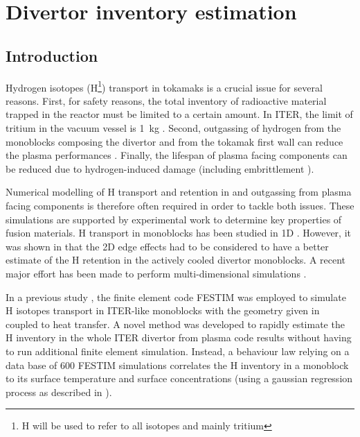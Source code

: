 \chapter{Divertor inventory estimation}
\section{Introduction}
Hydrogen isotopes (H\footnote{H will be used to refer to all isotopes and mainly tritium}) transport in tokamaks is a crucial issue for several reasons.
First, for safety reasons, the total inventory of radioactive material trapped in the reactor must be limited to a certain amount.
In ITER, the limit of tritium in the vacuum vessel is \SI{1}{kg} \cite{temmerman_influence_2018}.
Second, outgassing of hydrogen from the monoblocks composing the divertor and from the tokamak first wall can reduce the plasma performances \cite{grisolia_plasma_1999}.
Finally, the lifespan of plasma facing components can be reduced due to hydrogen-induced damage (including embrittlement \cite{dwivedi_hydrogen_2018}).

Numerical modelling of H transport and retention in and outgassing from plasma facing components \cite{delaporte-mathurin_parametric_2020, delaporte-mathurin_influence_2021, denis_dynamic_2019, dark_influence_2021} is therefore often required in order to tackle both issues. 
These simulations are supported by experimental work to determine key properties of fusion materials.
H transport in monoblocks has been studied in 1D \cite{hodille_estimation_2017}.
However, it was shown in \cite{delaporte-mathurin_finite_2019} that the 2D edge effects had to be considered to have a better estimate of the H retention in the actively cooled divertor monoblocks.
A recent major effort has been made to perform multi-dimensional simulations \cite{delaporte-mathurin_finite_2019, delaporte-mathurin_parametric_2020, delaporte-mathurin_influence_2021, benannoune_multidimensional_2020}.

In a previous study \cite{delaporte-mathurin_parametric_2020}, the finite element code FESTIM \cite{delaporte-mathurin_finite_2019, delaporte-mathurin_influence_2021} was employed to simulate H isotopes transport in ITER-like monoblocks with the geometry given in \cite{richou_realization_2017} coupled to heat transfer.
A novel method was developed to rapidly estimate the H inventory in the whole ITER divertor from plasma code results without having to run additional finite element simulation. Instead, a behaviour law relying on a data base of 600 FESTIM simulations correlates the H inventory in a monoblock to its surface temperature and surface concentrations (using a gaussian regression process as described in \cite{chris_bowman_c-bowmaninference-tools_2020}).

